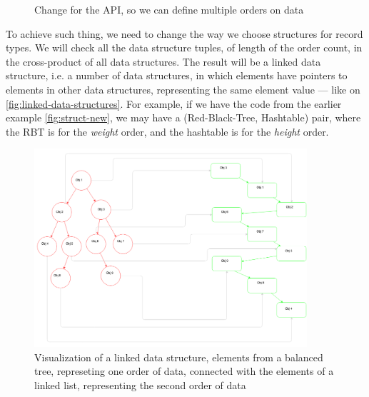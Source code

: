 \documentclass[a4paper,11pt]{article}
\begin{document}
            \begin{figure}[h!]
				

				\caption{Change for the API, so we can define multiple orders on data}

				\label{fig:struct-api-change}
			\end{figure}

            To achieve such thing, we need to change the way we choose structures for record types. We will check all
            the data structure tuples, of length of the order count, in the cross-product of all data structures. The
            result will be a linked data structure, i.e. a number of data structures, in which elements have pointers to
            elements in other data structures, representing the same element value --- like on
            \autoref{fig:linked-data-structures}. For example, if we have the code from the earlier example
            \autoref{fig:struct-new}, we may have a (Red-Black-Tree, Hashtable) pair, where the RBT is for the \emph{weight}
            order, and the hashtable is for the \emph{height} order.

            \begin{figure}[h!]
                \begin{center}
                    \includegraphics[width=0.9\textwidth]{thesis-pics/linked-dses.png}
                \end{center}

				\caption{Visualization of a linked data structure, elements from a balanced tree, represeting one order of data,
                 connected with the elements of a linked list, representing the second order of data}
				\label{fig:linked-data-structures}
			\end{figure}
\end{document}
